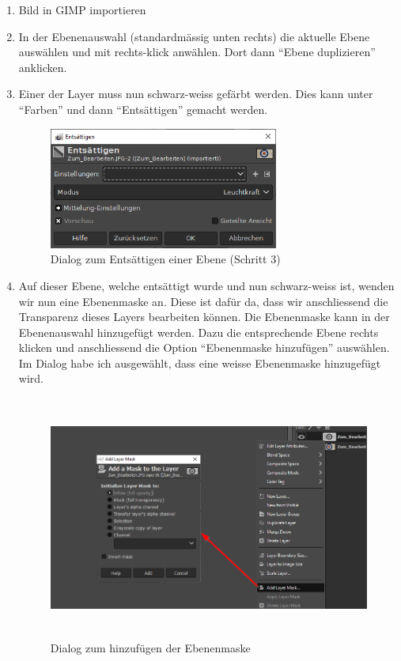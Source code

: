 \documentclass[11pt]{article}
\begin{document}
    \begin{enumerate}
        \item Bild in GIMP importieren
        \item In der Ebenenauswahl (standardmässig unten rechts) die aktuelle Ebene auswählen und mit rechts-klick
        anwählen. Dort dann ``Ebene duplizieren'' anklicken.
        \item Einer der Layer muss nun schwarz-weiss gefärbt werden. Dies kann unter ``Farben'' und dann
        ``Entsättigen'' gemacht werden.

        \begin{figure}[h]
            \centering
            \includegraphics[height=4cm]{media/menu_desaturate}
            \caption{Dialog zum Entsättigen einer Ebene (Schritt 3)}
        \end{figure}

        \item Auf dieser Ebene, welche entsättigt wurde und nun schwarz-weiss ist, wenden wir nun eine
        Ebenenmaske an. Diese ist dafür da, dass wir anschliessend die Transparenz dieses Layers bearbeiten können.
        Die Ebenenmaske kann in der Ebenenauswahl hinzugefügt werden. Dazu die entsprechende Ebene rechts klicken und
        anschliessend die Option ``Ebenenmaske hinzufügen'' auswählen. Im Dialog habe ich ausgewählt, dass eine weisse
        Ebenenmaske hinzugefügt wird.

        \begin{figure}[h]
            \centering
            \includegraphics[height=8cm]{media/layer_mask}
            \caption{Dialog zum hinzufügen der Ebenenmaske}
        \end{figure}


\end{enumerate}
\end{document}
